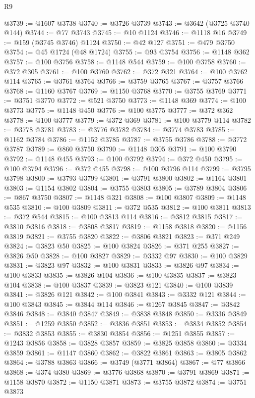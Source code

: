 \begin{lexlean}{R9}
\begin{coremodule}
{{{{{{{{{{{{{{{{{{{{{{{{{{{{{{{{{{{{{{{{{{{{{{{{{{{{{{{{{{{{{{{{{{{{{{{{{{{{{{{{{{{{{{{{{{{{{{{{{{{{{{{{{{{{@3739 := @1607 @3738
@3740 := @3726 @3739
@3743 := @3642 (@3725 @3740 @144)
@3744 := @77 @3743
@3745 := @10 @1124
@3746 := @1118 @16
@3749 := @159 (@3745 @3746) @1124
@3750 := @42 @127
@3751 := @479 @3750
@3754 := @45 @1724 (@48 @1724)
@3755 := @93 @3754
@3756 := @1148 @362
@3757 := @100 @3756
@3758 := @1148 @544
@3759 := @100 @3758
@3760 := @372 @305
@3761 := @100 @3760
@3762 := @372 @321
@3764 := @100 @3762 @114
@3765 := @3761 @3764
@3766 := @3759 @3765
@3767 := @3757 @3766
@3768 := @1160 @3767
@3769 := @1150 @3768
@3770 := @3755 @3769
@3771 := @3751 @3770
@3772 := @521 @3750
@3773 := @1148 @369
@3774 := @100 @3773
@3775 := @1148 @450
@3776 := @100 @3775
@3777 := @372 @362
@3778 := @100 @3777
@3779 := @372 @369
@3781 := @100 @3779 @114
@3782 := @3778 @3781
@3783 := @3776 @3782
@3784 := @3774 @3783
@3785 := @1162 @3784
@3786 := @1152 @3785
@3787 := @3755 @3786
@3788 := @3772 @3787
@3789 := @860 @3750
@3790 := @1148 @305
@3791 := @100 @3790
@3792 := @1148 @455
@3793 := @100 @3792
@3794 := @372 @450
@3795 := @100 @3794
@3796 := @372 @455
@3798 := @100 @3796 @114
@3799 := @3795 @3798
@3800 := @3793 @3799
@3801 := @3791 @3800
@3802 := @1164 @3801
@3803 := @1154 @3802
@3804 := @3755 @3803
@3805 := @3789 @3804
@3806 := @867 @3750
@3807 := @1148 @321
@3808 := @100 @3807
@3809 := @1148 @535
@3810 := @100 @3809
@3811 := @372 @535
@3812 := @100 @3811
@3813 := @372 @544
@3815 := @100 @3813 @114
@3816 := @3812 @3815
@3817 := @3810 @3816
@3818 := @3808 @3817
@3819 := @1158 @3818
@3820 := @1156 @3819
@3821 := @3755 @3820
@3822 := @3806 @3821
@3823 := @371 @249
@3824 := @3823 @50
@3825 := @100 @3824
@3826 := @371 @255
@3827 := @3826 @50
@3828 := @100 @3827
@3829 := @3332 @97
@3830 := @100 @3829
@3831 := @3823 @97
@3832 := @100 @3831
@3833 := @3826 @97
@3834 := @100 @3833
@3835 := @3826 @104
@3836 := @100 @3835
@3837 := @3823 @104
@3838 := @100 @3837
@3839 := @3823 @121
@3840 := @100 @3839
@3841 := @3826 @121
@3842 := @100 @3841
@3843 := @3332 @121
@3844 := @100 @3843
@3845 := @3844 @114
@3846 := @1267 @3845
@3847 := @3842 @3846
@3848 := @3840 @3847
@3849 := @3838 @3848
@3850 := @3336 @3849
@3851 := @1259 @3850
@3852 := @3836 @3851
@3853 := @3834 @3852
@3854 := @3832 @3853
@3855 := @3830 @3854
@3856 := @1251 @3855
@3857 := @1243 @3856
@3858 := @3828 @3857
@3859 := @3825 @3858
@3860 := @3334 @3859
@3861 := @1147 @3860
@3862 := @3822 @3861
@3863 := @3805 @3862
@3864 := @3788 @3863
@3866 := @3749 (@3771 @3864)
@3867 := @77 @3866
@3868 := @374 @380
@3869 := @3776 @3868
@3870 := @3791 @3869
@3871 := @1158 @3870
@3872 := @1150 @3871
@3873 := @3755 @3872
@3874 := @3751 @3873
}}}}}}}}}}}}}}}}}}}}}}}}}}}}}}}}}}}}}}}}}}}}}}}}}}}}}}}}}}}}}}}}}}}}}}}}}}}}}}}}}}}}}}}}}}}}}}}}}}}}}}}}}}}}
\end{coremodule}
\end{lexlean}

